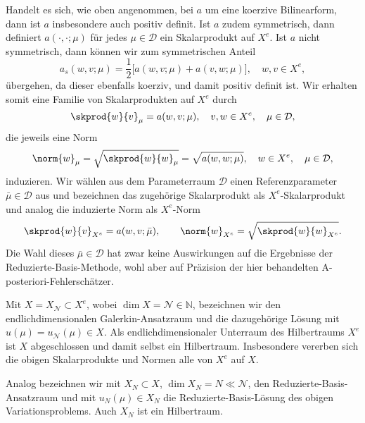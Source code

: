 Handelt es sich, wie oben angenommen, bei $a$ um eine koerzive Bilinearform, dann ist $a$ insbesondere auch positiv definit.
Ist $a$ zudem symmetrisch, dann definiert $a(\cdot, \cdot; \mu)$ für jedes $\mu \in \mathcal D$ ein Skalarprodukt auf $X^e$.
Ist $a$ nicht symmetrisch, dann können wir zum symmetrischen Anteil
\begin{equation}
    a_s(w, v; \mu) = \frac{1}{2} \Big[ a(w, v; \mu) + a(v, w; \mu) \Big], \quad w, v \in X^e,
\end{equation}
übergehen, da dieser ebenfalls koerziv, und damit positiv definit ist.
Wir erhalten somit eine Familie von Skalarprodukten auf $X^e$ durch
\begin{equation}
    \skprod{w}{v}_{\mu} = a(w, v; \mu), \quad v, w \in X^e, \quad \mu \in \mathcal D,
\end{equation}
die jeweils eine Norm
\begin{equation}
    \norm{w}_{\mu} = \sqrt{\skprod{w}{w}_{\mu}} = \sqrt{a(w, w; \mu)}, \quad w \in X^e, \quad \mu \in \mathcal D,
\end{equation}
induzieren.
Wir wählen aus dem Parameterraum $\mathcal D$ einen Referenzparameter $\bar \mu \in \mathcal D$ aus und bezeichnen das zugehörige Skalarprodukt als $X^e$-Skalarprodukt und analog die induzierte Norm als $X^e$-Norm
\begin{equation}
    \skprod{w}{v}_{X^e} = a(w, v; \bar \mu),
    \qquad
    \norm{w}_{X^e} = \sqrt{\skprod{w}{w}_{X^e}}.
\end{equation}
Die Wahl dieses $\bar \mu \in \mathcal D$ hat zwar keine Auswirkungen auf die Ergebnisse der Reduzierte-Basis-Methode, wohl aber auf Präzision der hier behandelten A-posteriori-Fehlerschätzer.

Mit $X = X_{\mathcal N} \subset X^e$, wobei $\dim X = \mathcal N \in \mathbb{N}$, bezeichnen wir den endlichdimensionalen Galerkin-Ansatzraum und die dazugehörige Lösung mit $u(\mu) = u_{\mathcal N}(\mu) \in X$.
Als endlichdimensionaler Unterraum des Hilbertraums $X^e$ ist $X$ abgeschlossen und damit selbst ein Hilbertraum.
Insbesondere vererben sich die obigen Skalarprodukte und Normen alle von $X^e$ auf $X$.

Analog bezeichnen wir mit $X_N \subset X$, $\dim X_N = N \ll \mathcal N$, den Reduzierte-Basis-Ansatzraum und mit $u_N(\mu) \in X_N$ die Reduzierte-Basis-Lösung des obigen Variationsproblems.
Auch $X_N$ ist ein Hilbertraum.

